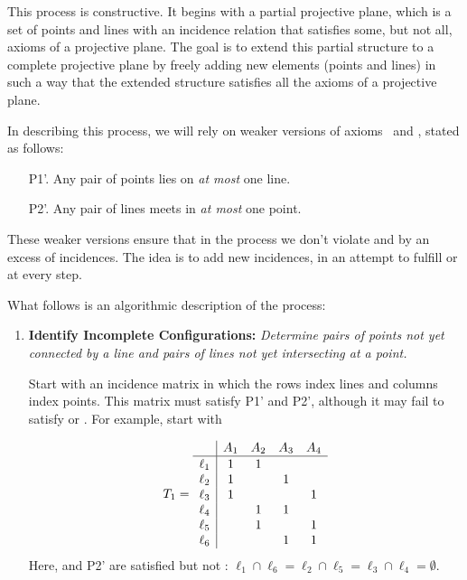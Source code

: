 \begin{xmpl}\label{xmpl:hall-plane} {}
    This process is constructive. It begins with a partial projective plane, which is a set of points and lines with an incidence relation that satisfies some, but not all, axioms of a projective plane. The goal is to extend this partial structure to a complete projective plane by freely adding new elements (points and lines) in such a way that the extended structure satisfies all the axioms of a projective plane.

    In describing this process, we will rely on weaker versions of axioms~ and , stated as follows:
    \begin{enumerate}
        \item[P1'.] Any pair of points lies on \emph{at most} one line.
        \item[P2'.] Any pair of lines meets in \emph{at most} one point.
    \end{enumerate}
    These weaker versions ensure that in the process we don't violate  and  by an excess of incidences. The idea is to add new incidences, in an attempt to fulfill  or  at every step.

    What follows is an algorithmic description of the process:
    \begin{enumerate}[1.]
        \item \textbf{Identify Incomplete Configurations:} \textit{Determine pairs of points not yet connected by a line and pairs of lines not yet intersecting at a point.}

        Start with an incidence matrix in which the rows index lines and columns index points. This matrix must satisfy P1' and P2', although it may fail to satisfy  or . For example, start with

        \vspace{-2\parskip}
        \small
        \begin{equation}\label{eq:T1}
            T_1 = \begin{array}{l|cccc}
                &A_1&A_2&A_3&A_4\\
                \hline\rule{0pt}{9pt}
                \ell_1&1&1\\
                \ell_2&1&&1\\
                \ell_3&1&&&1\\
                \ell_4&&1&1\\
                \ell_5&&1&&1\\
                \ell_6&&&1&1
            \end{array}            
        \end{equation}
        \normalsize
        Here,  and P2' are satisfied but not : $\ell_1\cap\ell_6=\ell_2\cap\ell_5=\ell_3\cap\ell_4=\emptyset$. 


\end{enumerate}
\end{xmpl}
